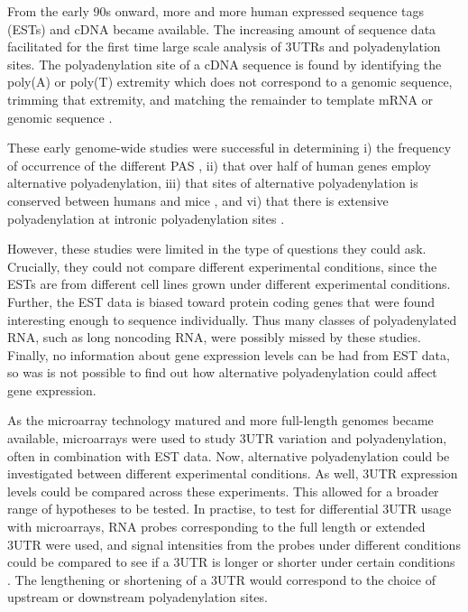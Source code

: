 From the early 90s onward, more and more human expressed sequence tags (ESTs)
and cDNA became available. The increasing amount of sequence data facilitated
for the first time large scale analysis of 3\p UTRs and polyadenylation sites.
The polyadenylation site of a cDNA sequence is found by identifying the poly(A)
or poly(T) extremity which does not correspond to a genomic sequence, trimming
that extremity, and matching the remainder to template mRNA or genomic sequence
\cite{beaudoing_patterns_2000, tian_large-scale_2005}.

These early genome-wide studies were successful in determining i) the frequency
of occurrence of the different PAS \cite{beaudoing_patterns_2000}, ii) that
over half of human genes employ alternative polyadenylation, iii) that sites of
alternative polyadenylation is conserved between humans and mice
\cite{tian_large-scale_2005}, and vi) that there is extensive polyadenylation
at intronic polyadenylation sites \cite{tian_widespread_2007}.

However, these studies were limited in the type of questions they could ask.
Crucially, they could not compare different experimental conditions, since the
ESTs are from different cell lines grown under different experimental
conditions. Further, the EST data is biased toward protein coding genes that
were found interesting enough to sequence individually. Thus many classes of
polyadenylated RNA, such as long noncoding RNA, were possibly missed by these
studies. Finally, no information about gene expression levels can be had from
EST data, so was is not possible to find out how alternative polyadenylation
could affect gene expression.

As the microarray technology matured and more full-length genomes became
available, microarrays were used to study 3\p UTR variation and
polyadenylation, often in combination with EST data. Now, alternative
polyadenylation could be investigated between different experimental
conditions. As well, 3UTR expression levels could be compared across these
experiments. This allowed for a broader range of hypotheses to be tested. In
practise, to test for differential 3UTR usage with microarrays, RNA probes
corresponding to the full length or extended 3UTR were used, and signal
intensities from the probes under different conditions could be compared to see
if a 3UTR is longer or shorter under certain conditions
\cite{sandberg_proliferating_2008, ji_progressive_2009}. The lengthening or
shortening of a 3\p UTR would correspond to the choice of upstream or
downstream polyadenylation sites.

